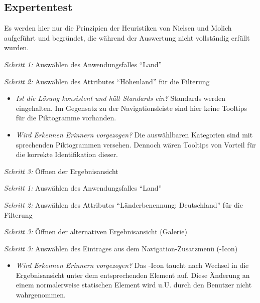 \subsection{Expertentest} \label{sec:resultExpert}
Es werden hier nur die Prinzipien der Heuristiken von Nielsen und Molich aufgeführt und begründet, die während der Auswertung nicht vollständig erfüllt wurden.\par
{}
\textit{Schritt 1:} Auswählen des Anwendungsfalles \enquote{Land}\par
\textit{Schritt 2:} Auswählen des Attributes \enquote{Höhenland} für die Filterung\par
\begin{itemize}
 \item \textit{Ist die Lösung konsistent und hält Standards ein?} Standards werden eingehalten. Im Gegensatz zu der Navigationsleiste sind hier keine Tooltips für die Piktogramme vorhanden.
 \item \textit{Wird Erkennen Erinnern vorgezogen?} Die auswählbaren Kategorien sind mit sprechenden Piktogrammen versehen. Dennoch wären Tooltips von Vorteil für die korrekte Identifikation dieser.
\end{itemize}
\textit{Schritt 3:} Öffnen der Ergebnisansicht\par
{}\par
\textit{Schritt 1:} Auswählen des Anwendungsfalles \enquote{Land}\par
\textit{Schritt 2:} Auswählen des Attributes \enquote{Länderbenennung: Deutschland} für die Filterung\par
\textit{Schritt 3:} Öffnen der alternativen Ergebnisansicht (Galerie)\par
{}\par
\textit{Schritt 3:} Auswählen des Eintrages aus dem Navigation-Zusatzmenü (-Icon)\par
\begin{itemize}
 \item \textit{Wird Erkennen Erinnern vorgezogen?} Das -Icon taucht nach Wechsel in die Ergebnisansicht unter dem entsprechenden Element auf. Diese Änderung an einem normalerweise statischen Element wird u.U. durch den Benutzer nicht wahrgenommen.\par
\end{itemize}
\par
